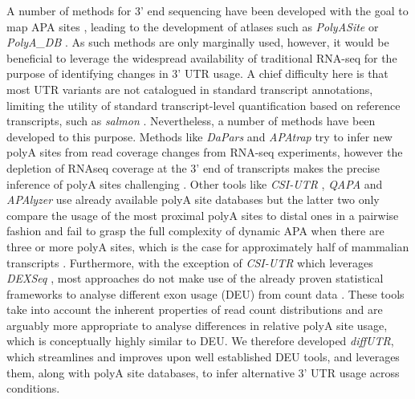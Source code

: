 \documentclass{bmcart}
\begin{document}
A number of methods for 3' end sequencing have been developed with the goal to map APA sites \cite{Fox-Walsh2011AFormation,Fu2011DifferentialSequencing,Zheng20163READS+RNA,Jan2011Formation3UTRs,Shepard2011ComplexPAS-Seq,Derti2012AMammals,Hwang2017CTag-PAPERCLIPActivation}, leading to the development of atlases such as \textit{PolyASite} \cite{Herrmann2020PolyASiteSequencing} or \textit{PolyA\_DB} \cite{WangPolyadb2018}. As such methods are only marginally used, however, it would be beneficial to leverage the widespread availability of traditional RNA-seq for the purpose of identifying changes in 3' UTR usage. A chief difficulty here is that most UTR variants are not catalogued in standard transcript annotations, limiting the utility of standard transcript-level quantification based on reference transcripts, such as \textit{salmon} \cite{PatroSalmon2017}. Nevertheless, a number of methods have been developed to this purpose. Methods like \textit{DaPars} \cite{Xia2014DynamicTypes} and \textit{APAtrap} \cite{Ye2018APAtrap:Data} try to infer new polyA sites from read coverage changes from RNA-seq experiments, however the depletion of RNAseq coverage at the 3' end of transcripts makes the precise inference of polyA sites challenging \cite{Wang2009RNA-Seq:Transcriptomics}. Other tools like \textit{CSI-UTR} \cite{HarrisonDetection2019}, \textit{QAPA} \cite{Ha2018QAPA:Data} and \textit{APAlyzer} \cite{Wang2020APAlyzer:Isoforms} use already available polyA site databases but the latter two only compare the usage of the most proximal polyA sites to distal ones in a pairwise fashion and fail to grasp the full complexity of dynamic APA when there are three or more polyA sites, which is the case for approximately half of mammalian transcripts \cite{Derti2012AMammals}. Furthermore, with the exception of \textit{CSI-UTR} \cite{HarrisonDetection2019} which leverages \textit{DEXSeq} \cite{Anders2012DetectingData}, most approaches do not make use of the already proven statistical frameworks to analyse different exon usage (DEU) from count data \cite{Anders2012DetectingData,Robinson2009EdgeR:Data,Law2014Voom:Counts,Ritchie2015LimmaStudies}. These tools take into account the inherent properties of read count distributions and are arguably more appropriate to analyse differences in relative polyA site usage, which is conceptually highly similar to DEU. We therefore developed \textit{diffUTR}, which streamlines and improves upon well established DEU tools, and leverages them, along with polyA site databases, to infer alternative 3' UTR usage across conditions.
\end{document}
